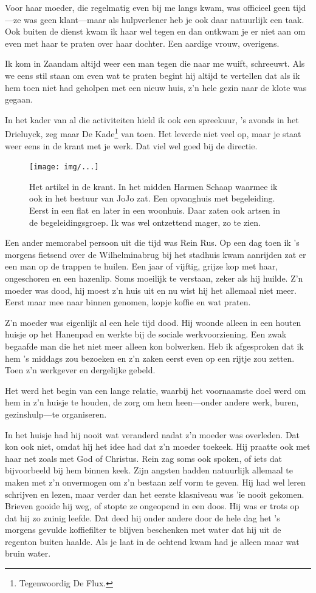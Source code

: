 \documentclass[12pt,twoside, openright]{memoir}
\begin{document}
Voor haar moeder, die regelmatig even bij me langs kwam, was officieel geen tijd---ze was geen klant---maar als hulpverlener heb je ook daar natuurlijk een taak. Ook buiten de dienst kwam ik haar wel tegen en dan ontkwam je er niet aan om even met haar te praten over haar dochter. Een aardige vrouw, overigens.

Ik kom in Zaandam altijd weer een man tegen die naar me wuift, schreeuwt. Als we eens stil staan om even wat te praten begint hij altijd te vertellen dat als ik hem toen niet had geholpen met een nieuw huis, z’n hele gezin naar de klote was gegaan.

In het kader van al die activiteiten hield ik ook een spreekuur, 's avonds in het Drieluyck, zeg maar De Kade\footnote{Tegenwoordig De Flux.} van toen. Het leverde niet veel op, maar je staat weer eens in de krant met je werk. Dat viel wel goed bij de directie. 

\begin{figure}[t]
\texttt{[image: img/...]}
\caption{Het artikel in de krant. In het midden Harmen Schaap waarmee ik ook in het bestuur van JoJo zat. Een opvanghuis met begeleiding. Eerst in een flat en later in een woonhuis. Daar zaten ook artsen in de begeleidingsgroep. Ik was wel ontzettend mager, zo te zien.}
\end{figure}

Een ander memorabel persoon uit die tijd was Rein Rus. Op een dag toen ik ’s morgens fietsend over de Wilhelminabrug bij het stadhuis kwam aanrijden zat er een man op de trappen te huilen. Een jaar of vijftig, grijze kop met haar, ongeschoren en een hazenlip. Soms moeilijk te verstaan, zeker als hij huilde. Z’n moeder was dood, hij moest z’n huis uit en nu wist hij het allemaal niet meer. Eerst maar mee naar binnen genomen, kopje koffie en wat praten. 

Z’n moeder was eigenlijk al een hele tijd dood. Hij woonde alleen in een houten huisje op het Hanenpad en werkte bij de sociale werkvoorziening. Een zwak begaafde man die het niet meer alleen kon bolwerken. Heb ik afgesproken dat ik hem ’s middags zou bezoeken en z’n zaken eerst even op een rijtje zou zetten. Toen z'n werkgever en dergelijke gebeld. 

Het werd het begin van een lange relatie, waarbij het voornaamste doel werd om hem in z’n huisje te houden, de zorg om hem heen---onder andere werk, buren, gezinshulp---te organiseren. 

In het huisje had hij nooit wat veranderd nadat z’n moeder was overleden. Dat kon ook niet, omdat hij het idee had dat z’n moeder toekeek. Hij praatte ook met haar net zoals met God of Christus. Rein zag soms ook spoken, of iets dat bijvoorbeeld bij hem binnen keek. Zijn angsten hadden natuurlijk allemaal te maken met z’n onvermogen om z’n bestaan zelf vorm te geven. Hij had wel leren schrijven en lezen, maar verder dan het eerste klasniveau was 'ie nooit gekomen. Brieven gooide hij weg, of stopte ze ongeopend in een doos. Hij was er trots op dat hij zo zuinig leefde. Dat deed hij onder andere door de hele dag het ’s morgens gevulde koffiefilter te blijven beschenken met water dat hij uit de regenton buiten haalde. Als je laat in de ochtend kwam had je alleen maar wat bruin water. 
\end{document}
